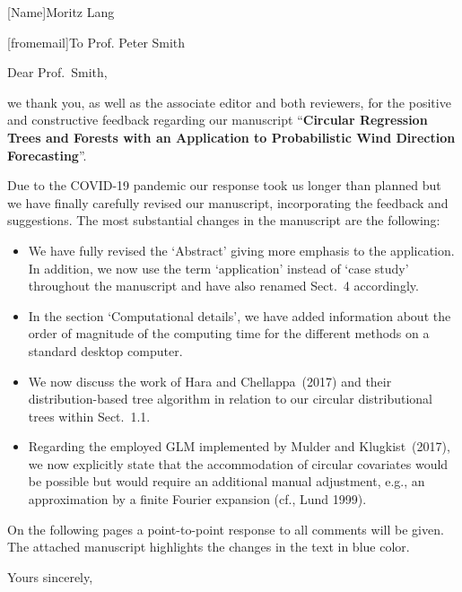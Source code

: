 \documentclass[english, noconfig]{uibklttr}
\begin{document}

[Name]{Moritz Lang}





\begin{letter}[fromemail]{To Prof. Peter Smith}
\opening{Dear Prof.\ Smith,}

we thank you, as well as the associate editor and both reviewers, for the
positive and constructive feedback regarding our manuscript ``\textbf{Circular
Regression Trees and Forests with an Application to Probabilistic Wind
Direction Forecasting}''.

\vspace{5mm}

Due to the COVID-19 pandemic our response took us longer than planned but
we have finally carefully revised our manuscript, incorporating the feedback
and suggestions. The most substantial changes in the manuscript are the following:

\begin{itemize}
\item We have fully revised the `Abstract' giving more emphasis to the application.
In addition, we now use the term `application' instead of `case study' throughout
the manuscript and have also renamed Sect.~4 accordingly.
 
\item In the section `Computational details', we have added information about the
order of magnitude of the computing time for the different methods on a standard desktop computer. 

\item We now discuss the work of Hara and Chellappa~(2017) and their distribution-based 
tree algorithm in relation to our circular distributional trees within Sect.~1.1.

\item Regarding the employed GLM implemented by Mulder and Klugkist~(2017), we now
explicitly state that the accommodation of circular covariates would be possible
but would require an additional manual adjustment, e.g., an approximation by a finite
Fourier expansion (cf., Lund 1999).

\end{itemize}

\vspace{5mm}

On the following pages a point-to-point response to all comments will be given.
The attached manuscript highlights the changes in the text in blue color.

\closing{Yours sincerely,}

\end{letter}
\end{document}
